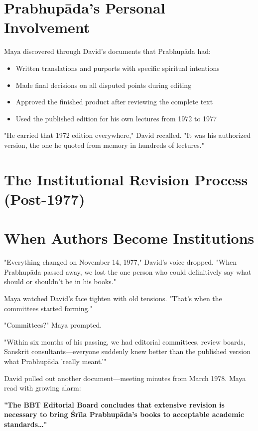 \documentclass[11pt,twoside]{book}
\begin{document}
\section*{Prabhupāda's Personal Involvement}
\label{sec:org480d3a6}

Maya discovered through David's documents that Prabhupāda had:
\begin{itemize}
\item Written translations and purports with specific spiritual intentions
\item Made final decisions on all disputed points during editing
\item Approved the finished product after reviewing the complete text
\item Used the published edition for his own lectures from 1972 to 1977
\end{itemize}

"He carried that 1972 edition everywhere," David recalled. "It was his authorized version, the one he quoted from memory in hundreds of lectures."
\section*{The Institutional Revision Process (Post-1977)}
\label{sec:org29a3bbe}

\section*{When Authors Become Institutions}
\label{sec:org94ca7b8}

"Everything changed on November 14, 1977," David's voice dropped. "When Prabhupāda passed away, we lost the one person who could definitively say what should or shouldn't be in his books."

Maya watched David's face tighten with old tensions. "That's when the committees started forming."

"Committees?" Maya prompted.

"Within six months of his passing, we had editorial committees, review boards, Sanskrit consultants—everyone suddenly knew better than the published version what Prabhupāda 'really meant.'"

David pulled out another document—meeting minutes from March 1978. Maya read with growing alarm:

\textbf{"The BBT Editorial Board concludes that extensive revision is necessary to bring Śrīla Prabhupāda's books to acceptable academic standards\ldots{}"}
\end{document}
